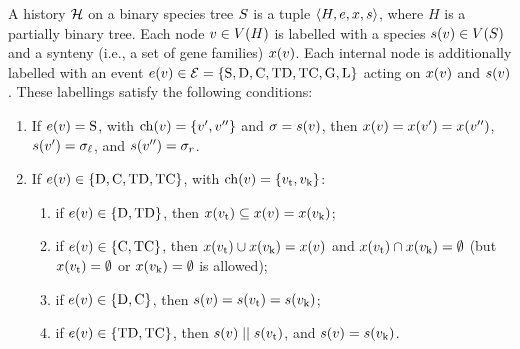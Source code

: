 \begin{definition}\label{def:synesth:hist}
    A history \(\mathcal{H}\) on a binary species tree \(S\) is a tuple \(\left\langle H, e, x, s\right\rangle\), where \(H\) is a partially binary tree.
    Each node \(v \in V(H)\) is labelled with a species \(s(v) \in V(S)\) and a synteny (i.e., a set of gene families) \(x(v)\).
    Each internal node is additionally labelled with an event \(e(v) \in \mathcal{E} = \{\mathrm{S},\allowbreak \mathrm{D},\allowbreak \mathrm{C},\allowbreak \mathrm{TD},\allowbreak \mathrm{TC},\allowbreak \mathrm{G},\allowbreak \mathrm{L}\}\) acting on \(x(v)\) and \(s(v)\).
    These labellings satisfy the following conditions:
    \begin{enumerate}
        \item\label{def:synesth:hist-spe}
            If \(e(v) = \mathrm{S}\),
            with \(\mathrm{ch}(v) = \{v', v''\}\) and \(\sigma = s(v)\),
            then \(x(v) = x(v') = x(v'')\),
            \(s(v') = \sigma_\mathit{\ell}\),
            and \(s(v'') = \sigma_r\).

    	\item If \(e(v) \in \{\mathrm{D}, \mathrm{C}, \mathrm{TD}, \mathrm{TC}\}\),
            with \(\mathrm{ch}(v) = \{v_\mathrm{t}, v_\mathrm{k}\}\):

    	\begin{enumerate}
            \item if \(e(v) \in \{\mathrm{D}, \mathrm{TD}\}\),
                then \(x(v_\mathrm{t}) \subseteq x(v) = x(v_\mathrm{k})\);

            \item if \(e(v) \in \{\mathrm{C}, \mathrm{TC}\}\),
                then \(x(v_\mathrm{t}) \cup x(v_\mathrm{k}) = x(v)\)
                and \(x(v_\mathrm{t}) \cap x(v_\mathrm{k}) = \emptyset\)
                (but \(x(v_\mathrm{t}) = \emptyset\) or \(x(v_\mathrm{k}) = \emptyset\) is allowed);

            \item if \(e(v) \in \{\mathrm{D}, \mathrm{C}\}\),
                then \(s(v) = s(v_\mathrm{t}) = s(v_\mathrm{k})\);

            \item if \(e(v) \in \{\mathrm{TD}, \mathrm{TC}\}\),
                then \(s(v) \mathrel{||} s(v_\mathrm{t})\),
                and \(s(v) = s(v_\mathrm{k})\).
        \end{enumerate}


\end{enumerate}
\end{definition}
